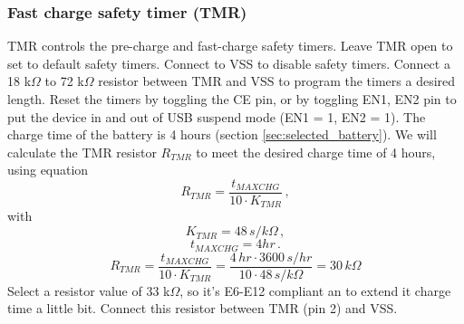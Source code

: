 \documentclass[11pt,a4paper]{article}
\begin{document}
\subsubsection{Fast charge safety timer (TMR)}
TMR controls the pre-charge and fast-charge safety timers. Leave TMR open to set to default safety timers. Connect to VSS to disable safety timers. Connect a 18 k$\Omega$ to 72 k$\Omega$ resistor between TMR and VSS to program the timers a desired length. Reset the timers by toggling the CE pin, or by toggling EN1, EN2 pin to put the device in and out of USB suspend mode (EN1 = 1, EN2 = 1). The charge time of the battery is 4 hours (section \ref{sec:selected_battery}). We will calculate the TMR resistor $R_{TMR}$ to meet the desired charge time of 4 hours, using equation \cite{bib:BQ24075}
\begin{equation}
R_{TMR} = \frac{t_{MAXCHG}}{10 \cdot K_{TMR}} \,,
\end{equation}
with 
\begin{equation}
K_{TMR} = 48 \, s/k\Omega \,,
\end{equation}
\begin{equation}
t_{MAXCHG} = 4 hr \,.
\end{equation}
\begin{equation}
R_{TMR} = \frac{t_{MAXCHG}}{10 \cdot K_{TMR}} = \frac{4 \, hr \cdot 3600 \, s/hr}{10 \cdot 48 \, s/k\Omega} = 30 \, k\Omega
\end{equation}
Select a resistor value of 33 k$\Omega$, so it's E6-E12 compliant an to extend it charge time a little bit. Connect this resistor between TMR (pin 2) and VSS.
\end{document}
